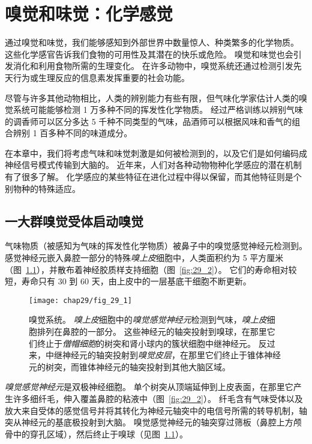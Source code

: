 \chapter{嗅觉和味觉：化学感觉} \label{chap:chap29}

通过嗅觉和味觉，我们能够感知到外部世界中数量惊人、种类繁多的化学物质。
这些化学感官告诉我们食物的可用性及其潜在的快乐或危险。
嗅觉和味觉也会引发消化和利用食物所需的生理变化。
在许多动物中，嗅觉系统还通过检测引发先天行为或生理反应的信息素发挥重要的社会功能。


尽管与许多其他动物相比，人类的辨别能力有些有限，但气味化学家估计人类的嗅觉系统可能能够检测 1 万多种不同的挥发性化学物质。
经过严格训练以辨别气味的调香师可以区分多达 5 千种不同类型的气味，品酒师可以根据风味和香气的组合辨别 1 百多种不同的味道成分。


在本章中，我们将考虑气味和味觉刺激是如何被检测到的，以及它们是如何编码成神经信号模式传输到大脑的。
近年来，人们对各种动物物种化学感应的潜在机制有了很多了解。
化学感应的某些特征在进化过程中得以保留，而其他特征则是个别物种的特殊适应。



\section{一大群嗅觉受体启动嗅觉}

气味物质（被感知为气味的挥发性化学物质）被鼻子中的嗅觉感觉神经元检测到。
感觉神经元嵌入鼻腔一部分的特殊\textit{嗅上皮}细胞中，人类面积约为 5 平方厘米（图~\ref{fig:29_1}），并散布着神经胶质样支持细胞（图~\ref{fig:29_2}）。
它们的寿命相对较短，寿命只有 30 到 60 天，由上皮中的一层基底干细胞不断更新。


\begin{figure}[htbp]
	\centering
	\texttt{[image: chap29/fig\_29\_1]}
	\caption{嗅觉系统。
	\textit{嗅上皮}细胞中的\textit{嗅觉感觉神经元}检测到气味，\textit{嗅上皮}细胞排列在鼻腔的一部分。
	这些神经元的轴突投射到嗅球，在那里它们终止于\textit{僧帽细胞}的树突和肾小球内的簇状细胞中继神经元。
	反过来，中继神经元的轴突投射到\textit{嗅觉皮层}，在那里它们终止于锥体神经元的树突，而锥体神经元的轴突投射到其他大脑区域。}
	\label{fig:29_1}
\end{figure}


\textit{嗅觉感觉神经元}是双极神经细胞。
单个树突从顶端延伸到上皮表面，在那里它产生许多细纤毛，伸入覆盖鼻腔的粘液中（图~\ref{fig:29_2}）。
纤毛含有气味受体以及放大来自受体的感觉信号并将其转化为神经元轴突中的电信号所需的转导机制，轴突从神经元的基底极投射到大脑。
嗅觉感觉神经元的轴突穿过筛板（鼻腔上方颅骨中的穿孔区域），然后终止于嗅球（见图~\ref{fig:29_1}）。


